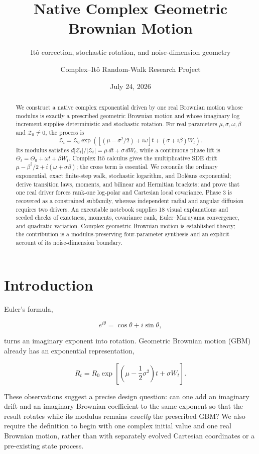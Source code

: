 \documentclass[
  english,
  10pt,
  letterpaper,
  DIV=11,
  numbers=noendperiod]{scrartcl}
\title{Native Complex Geometric Brownian Motion}
\subtitle{Itô correction, stochastic rotation, and noise-dimension
geometry}
\author{Complex--Itô Random-Walk Research Project}
\date{July 24, 2026}
\renewcommand*\contentsname{Table of contents}
\newcommand\contentsname{Table of contents}
\begin{document}
\maketitle
\begin{abstract}
We construct a native complex exponential driven by one real Brownian
motion whose modulus is exactly a prescribed geometric Brownian motion
and whose imaginary log increment supplies deterministic and stochastic
rotation. For real parameters \(\mu,\sigma,\omega,\beta\) and
\(\mathcal Z_0\ne0\), the process is \[
\mathcal Z_t=\mathcal Z_0
\exp\!\left(
[(\mu-\sigma^2/2)+i\omega]t+(\sigma+i\beta)W_t
\right).
\] Its modulus satisfies \(d|\mathcal Z_t|/|\mathcal Z_t|
=\mu\,dt+\sigma\,dW_t\), while a continuous phase lift is
\(\Theta_t=\Theta_0+\omega t+\beta W_t\). Complex Itô calculus gives the
multiplicative SDE drift \(\mu-\beta^2/2+i(\omega+\sigma\beta)\); the
cross term is essential. We reconcile the ordinary exponential, exact
finite-step walk, stochastic logarithm, and Doléans exponential; derive
transition laws, moments, and bilinear and Hermitian brackets; and prove
that one real driver forces rank-one log-polar and Cartesian local
covariance. Phase 3 is recovered as a constrained subfamily, whereas
independent radial and angular diffusion requires two drivers. An
executable notebook supplies 18 visual explanations and seeded checks of
exactness, moments, covariance rank, Euler--Maruyama convergence, and
quadratic variation. Complex geometric Brownian motion is established
theory; the contribution is a modulus-preserving four-parameter
synthesis and an explicit account of its noise-dimension boundary.
\end{abstract}

\renewcommand*\contentsname{Table of contents}
{
\setcounter{tocdepth}{1}
\tableofcontents
}

\section{Introduction}\label{sec-introduction}

Euler's formula,

\[
e^{i\theta}=\cos\theta+i\sin\theta,
\]

turns an imaginary exponent into rotation. Geometric Brownian motion
(GBM) already has an exponential representation,

\[
R_t=R_0\exp\!\left[
\left(\mu-\frac12\sigma^2\right)t+\sigma W_t
\right].
\]

These observations suggest a precise design question: can one add an
imaginary drift and an imaginary Brownian coefficient to the same
exponent so that the result rotates while its modulus remains
\emph{exactly} the prescribed GBM? We also require the definition to
begin with one complex initial value and one real Brownian motion,
rather than with separately evolved Cartesian coordinates or a
pre-existing state process.
\end{document}
